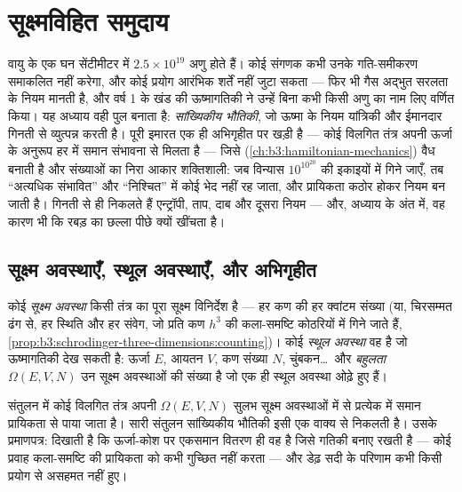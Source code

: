 \chapter{सूक्ष्मविहित समुदाय}\label{ch:b3:microcanonical-ensemble}

वायु के एक घन सेंटीमीटर में $2.5\times10^{19}$ अणु होते हैं। कोई
संगणक कभी उनके गति-समीकरण समाकलित नहीं करेगा, और कोई प्रयोग आरंभिक
शर्तें नहीं जुटा सकता --- फिर भी गैस अद्भुत सरलता के नियम मानती है,
और वर्ष 1 के खंड की ऊष्मागतिकी ने उन्हें बिना कभी किसी अणु का नाम लिए
वर्णित किया। यह अध्याय वही पुल बनाता है: \emph{सांख्यिकीय भौतिकी}, जो
ऊष्मा के नियम यांत्रिकी और ईमानदार गिनती से व्युत्पन्न करती है। पूरी
इमारत एक ही अभिगृहीत पर खड़ी है --- कोई विलगित तंत्र अपनी ऊर्जा के
अनुरूप हर  में समान संभावना से मिलता है ---
जिसे 
(\cref{ch:b3:hamiltonian-mechanics}) वैध बनाती है और संख्याओं का
निरा आकार शक्तिशाली: जब विन्यास
$10^{10^{20}}$ की इकाइयों में गिने जाएँ, तब ``अत्यधिक संभावित'' और
``निश्चित'' में कोई भेद नहीं रह जाता, और प्रायिकता कठोर होकर नियम बन
जाती है। गिनती से ही निकलते हैं एन्ट्रॉपी, ताप, दाब और दूसरा नियम ---
और, अध्याय के अंत में, वह कारण भी कि रबड़ का छल्ला पीछे क्यों खींचता है।

\section{सूक्ष्म अवस्थाएँ, स्थूल अवस्थाएँ, और अभिगृहीत}

\begin{definition}[सूक्ष्म और स्थूल अवस्थाएँ]\label{def:b3:microcanonical-ensemble:states}
कोई \emph{सूक्ष्म अवस्था} किसी तंत्र का पूरा सूक्ष्म विनिर्देश है ---
हर कण की हर क्वांटम संख्या (या, चिरसम्मत ढंग से, हर स्थिति और हर
संवेग, जो प्रति कण $h^3$ की कला-समष्टि कोठरियों में गिने जाते हैं,
\cref{prop:b3:schrodinger-three-dimensions:counting})।
कोई \emph{स्थूल अवस्था} वह है जो ऊष्मागतिकी देख सकती है: ऊर्जा $E$,
आयतन $V$, कण संख्या $N$, चुंबकन\dots\ और
\emph{बहुलता} $\Omega(E, V, N)$ उन सूक्ष्म अवस्थाओं की संख्या है
जो एक ही स्थूल अवस्था ओढ़े हुए हैं।
\end{definition}

\begin{theorem}[मूल अभिगृहीत]\label{thm:b3:microcanonical-ensemble:postulate}
संतुलन में कोई विलगित तंत्र अपनी $\Omega(E, V, N)$ सुलभ सूक्ष्म
अवस्थाओं में से प्रत्येक में समान प्रायिकता से पाया जाता है। सारी
संतुलन सांख्यिकीय भौतिकी इसी एक वाक्य से निकलती है।
उसके प्रमाणपत्र:  दिखाती है कि ऊर्जा-कोश पर एकसमान
वितरण ही वह है जिसे गतिकी बनाए रखती है --- कोई प्रवाह कला-समष्टि की
प्रायिकता को कभी गुच्छित नहीं करता --- और डेढ़ सदी के परिणाम कभी किसी
प्रयोग से असहमत नहीं हुए।
\end{theorem}
\admitted

